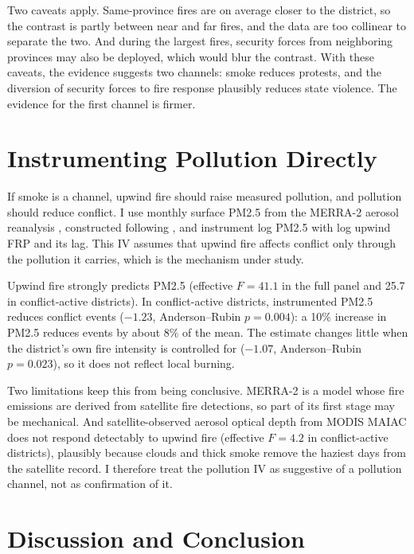 \documentclass[12pt]{article}
\begin{document}
Two caveats apply. Same-province fires are on average closer to the district, so the contrast is partly between near and far fires, and the data are too collinear to separate the two. And during the largest fires, security forces from neighboring provinces may also be deployed, which would blur the contrast. With these caveats, the evidence suggests two channels: smoke reduces protests, and the diversion of security forces to fire response plausibly reduces state violence. The evidence for the first channel is firmer.

\section{Instrumenting Pollution Directly}
\label{sec:pollution}

If smoke is a channel, upwind fire should raise measured pollution, and pollution should reduce conflict. I use monthly surface PM2.5 from the MERRA-2 aerosol reanalysis \citep{gelaro2017merra}, constructed following \citet{buchard2016}, and instrument log PM2.5 with log upwind FRP and its lag. This IV assumes that upwind fire affects conflict only through the pollution it carries, which is the mechanism under study.

Upwind fire strongly predicts PM2.5 (effective $F = 41.1$ in the full panel and 25.7 in conflict-active districts). In conflict-active districts, instrumented PM2.5 reduces conflict events ($-1.23$, Anderson--Rubin $p=0.004$): a 10\% increase in PM2.5 reduces events by about 8\% of the mean. The estimate changes little when the district's own fire intensity is controlled for ($-1.07$, Anderson--Rubin $p=0.023$), so it does not reflect local burning.

Two limitations keep this from being conclusive. MERRA-2 is a model whose fire emissions are derived from satellite fire detections, so part of its first stage may be mechanical. And satellite-observed aerosol optical depth from MODIS MAIAC does not respond detectably to upwind fire (effective $F = 4.2$ in conflict-active districts), plausibly because clouds and thick smoke remove the haziest days from the satellite record. I therefore treat the pollution IV as suggestive of a pollution channel, not as confirmation of it.

\section{Discussion and Conclusion}
\label{sec:conclusion}
\end{document}
